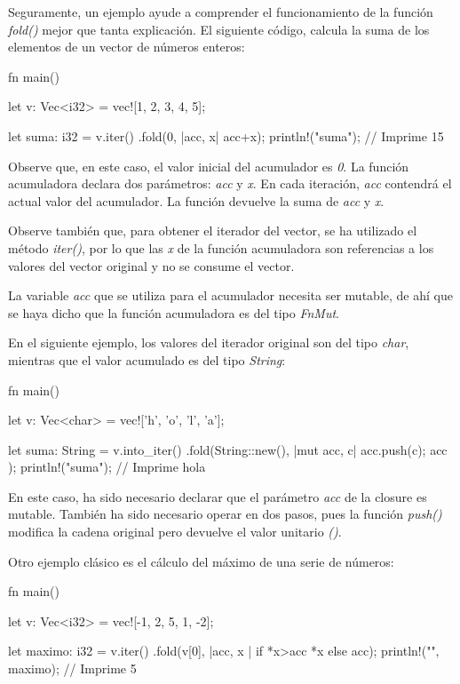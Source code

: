 Seguramente, un ejemplo ayude a comprender el funcionamiento de la función \textit{fold()} mejor que tanta explicación. El siguiente código, calcula la suma de los elementos de un vector de números enteros:

\vspace{0.7em}
\begin{Codigo}
fn main() {
   let v: Vec<i32> = vec![1, 2, 3, 4, 5];
   
   let suma: i32 = v.iter()
      .fold(0, |acc, x| acc+x);
   println!("{suma}"); // Imprime 15
}
\end{Codigo}

Observe que, en este caso, el valor inicial del acumulador es \textit{0}. La función acumuladora declara dos parámetros: \textit{acc} y \textit{x}. En cada iteración, \textit{acc} contendrá el actual valor del acumulador. La función devuelve la suma de \textit{acc} y \textit{x}. 

Observe también que, para obtener el iterador del vector, se ha utilizado el método \textit{iter()}, por lo que las \textit{x} de la función acumuladora son referencias a los valores del vector original y no se consume el vector.

La variable \textit{acc} que se utiliza para el acumulador necesita ser mutable, de ahí que se haya dicho que la función acumuladora es del tipo \textit{FnMut}.

En el siguiente ejemplo, los valores del iterador original son del tipo \textit{char}, mientras que el valor acumulado es del tipo \textit{String}:

\vspace{0.7em}
\begin{Codigo}
fn main() {
   let v: Vec<char> = vec!['h', 'o', 'l', 'a'];
   
   let suma: String = v.into_iter()
      .fold(String::new(), |mut acc, c| {
            acc.push(c);
            acc
         }
      );
   println!("{suma}"); // Imprime hola
}
\end{Codigo}

En este caso, ha sido necesario declarar que el parámetro \textit{acc} de la closure es mutable. También ha sido necesario operar en dos pasos, pues la función \textit{push()} modifica la cadena original pero devuelve el valor unitario \textit{()}.

Otro ejemplo clásico es el cálculo del máximo de una serie de números:

\vspace{0.7em}
\begin{Codigo}
fn main() {
   let v: Vec<i32> = vec![-1, 2, 5, 1, -2];
   
   let maximo: i32 = v.iter()
      .fold(v[0], |acc, x | if *x>acc {*x} else {acc});
   println!("{}", maximo); // Imprime 5
}
\end{Codigo}

